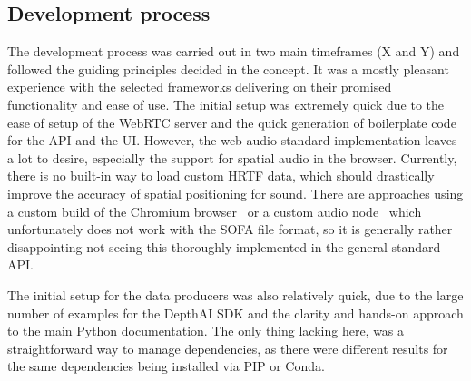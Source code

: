 \subsection{Development process}

The development process was carried out in two main timeframes (X and Y) and followed the guiding principles decided in the concept.
It was a mostly pleasant experience with the selected frameworks delivering on their promised functionality and ease of use.
The initial setup was extremely quick due to the ease of setup of the WebRTC server and the quick generation of boilerplate code for the \ac{API} and the \ac{UI}.
However, the web audio standard implementation leaves a lot to desire, especially the support for spatial audio in the browser.
Currently, there is no built-in way to load custom \ac{HRTF} data, which should drastically improve the accuracy of spatial positioning for sound.
There are approaches using a custom build of the Chromium browser~\parencite{chromiumCustomHrtf} or a custom audio node~\parencite{customHrtfAudioNode} which unfortunately does not work with the \ac{SOFA} file format, so it is generally rather disappointing not seeing this thoroughly implemented in the general standard \ac{API}.

The initial setup for the data producers was also relatively quick, due to the large number of examples for the DepthAI \ac{SDK} and the clarity and hands-on approach to the main Python documentation.
The only thing lacking here, was a straightforward way to manage dependencies, as there were different results for the same dependencies being installed via PIP or Conda.

